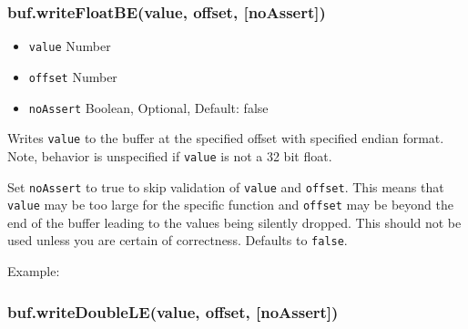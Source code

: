 \subsubsection{buf.writeFloatBE(value, offset,
{[}noAssert{]})}\label{buf.writefloatbevalue-offset-noassert}

\begin{itemize}
\itemsep1pt\parskip0pt
\item
  \texttt{value} Number
\item
  \texttt{offset} Number
\item
  \texttt{noAssert} Boolean, Optional, Default: false
\end{itemize}

Writes \texttt{value} to the buffer at the specified offset with
specified endian format. Note, behavior is unspecified if \texttt{value}
is not a 32 bit float.

Set \texttt{noAssert} to true to skip validation of \texttt{value} and
\texttt{offset}. This means that \texttt{value} may be too large for the
specific function and \texttt{offset} may be beyond the end of the
buffer leading to the values being silently dropped. This should not be
used unless you are certain of correctness. Defaults to \texttt{false}.

Example:

\begin{Shaded}
\begin{Highlighting}[]
  \NormalTok{(}\NormalTok{);}
\NormalTok{(}\NormalTok{, }\NormalTok{);}


\NormalTok{(}\NormalTok{, }\NormalTok{);}


\end{Highlighting}
\end{Shaded}

\subsubsection{buf.writeDoubleLE(value, offset,
{[}noAssert{]})}\label{buf.writedoublelevalue-offset-noassert}

